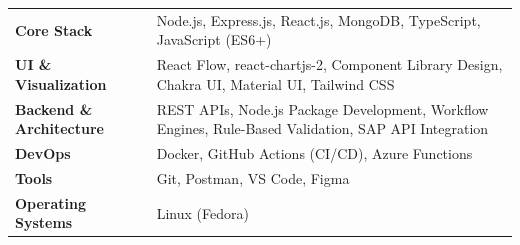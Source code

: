 \documentclass[11pt,a4paper]{moderncv}
\begin{document}
\begin{tabularx}{\textwidth}{>{\bfseries}l@{\hskip 3mm}X}
Core Stack & Node.js, Express.js, React.js, MongoDB, TypeScript, JavaScript (ES6+) \\
UI \& Visualization & React Flow, react-chartjs-2, Component Library Design, Chakra UI, Material UI, Tailwind CSS \\
Backend \& Architecture & REST APIs, Node.js Package Development, Workflow Engines, Rule-Based Validation, SAP API Integration \\
DevOps & Docker, GitHub Actions (CI/CD), Azure Functions \\
Tools & Git, Postman, VS Code, Figma \\
Operating Systems & Linux (Fedora) \\
\end{tabularx}
\end{document}
